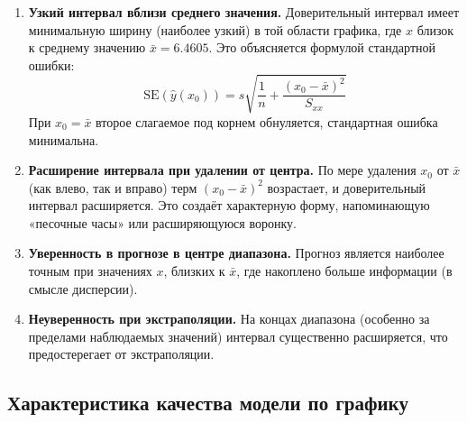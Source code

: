 \documentclass[12pt,a4paper]{article}
\begin{document}
\begin{enumerate}
\item \textbf{Узкий интервал вблизи среднего значения.} Доверительный интервал имеет минимальную ширину (наиболее узкий) в той области графика, где $x$ близок к среднему значению $\bar{x} = 6.4605$. Это объясняется формулой стандартной ошибки:
\[
\text{SE}(\hat{y}(x_0)) = s \sqrt{\frac{1}{n} + \frac{(x_0 - \bar{x})^2}{S_{xx}}}
\]
При $x_0 = \bar{x}$ второе слагаемое под корнем обнуляется, стандартная ошибка минимальна.

\item \textbf{Расширение интервала при удалении от центра.} По мере удаления $x_0$ от $\bar{x}$ (как влево, так и вправо) терм $(x_0 - \bar{x})^2$ возрастает, и доверительный интервал расширяется. Это создаёт характерную форму, напоминающую «песочные часы» или расширяющуюся воронку.

\item \textbf{Уверенность в прогнозе в центре диапазона.} Прогноз является наиболее точным при значениях $x$, близких к $\bar{x}$, где накоплено больше информации (в смысле дисперсии).

\item \textbf{Неуверенность при экстраполяции.} На концах диапазона (особенно за пределами наблюдаемых значений) интервал существенно расширяется, что предостерегает от экстраполяции.
\end{enumerate}

\subsection{Характеристика качества модели по графику}
\end{document}
